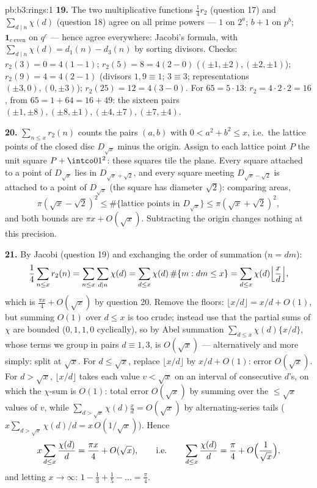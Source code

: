 \begin{solution}{pb:b3:rings:1}
\textbf{19.} The two multiplicative functions
$\frac14r_2$ (question 17) and $\sum_{d\mid n}\chi(d)$
(question 18) agree on all prime powers --- $1$ on $2^a$;
$b + 1$ on $p^b$; $\mathbf 1_{c\ \mathrm{even}}$ on $q^c$ ---
hence agree everywhere: Jacobi's formula, with $\sum_{d\mid
n}\chi(d) = d_1(n) - d_3(n)$ by sorting divisors. Checks:
$r_2(3) = 0 = 4(1 - 1)$; $r_2(5) = 8 = 4(2 - 0)$
($(\pm1,\pm2), (\pm2,\pm1)$); $r_2(9) = 4 = 4(2 - 1)$
(divisors $1, 9 \equiv 1$; $3 \equiv 3$; representations
$(\pm3, 0), (0, \pm3)$); $r_2(25) = 12 = 4(3 - 0)$. For $65 =
5\cdot13$: $r_2 = 4\cdot2\cdot2 = 16$, from $65 = 1 + 64 = 16
+ 49$: the sixteen pairs $(\pm1, \pm8), (\pm8, \pm1), (\pm4,
\pm7), (\pm7, \pm4)$.

\textbf{20.} $\sum_{n \leq x}r_2(n)$ counts the pairs $(a, b)$
with $0 < a^2 + b^2 \leq x$, i.e.\ the lattice points of the
closed disc $D_{\sqrt x}$ minus the origin. Assign to each
lattice point $P$ the unit square $P + \intco01^2$: these
squares tile the plane. Every square attached to a point of
$D_{\sqrt x}$ lies in $D_{\sqrt x + \sqrt2}$, and every square
meeting $D_{\sqrt x - \sqrt 2}$ is attached to a point of
$D_{\sqrt x}$ (the square has diameter $\sqrt 2$): comparing
areas,
\[
\pi(\sqrt x - \sqrt2)^2 \leq \#\{\text{lattice points in }
D_{\sqrt x}\} \leq \pi(\sqrt x + \sqrt 2)^2,
\]
and both bounds are $\pi x + O(\sqrt x)$. Subtracting the
origin changes nothing at this precision.

\textbf{21.} By Jacobi (question 19) and exchanging the order
of summation ($n = dm$):
\[
\frac14\sum_{n\leq x}r_2(n) = \sum_{n \leq x}\sum_{d \mid
n}\chi(d) = \sum_{d \leq x}\chi(d)\,\#\{m : dm \leq x\}
= \sum_{d\leq x}\chi(d)\Bigl\lfloor\frac xd\Bigr\rfloor,
\]
which is $\frac{\pi x}4 + O(\sqrt x)$ by question 20. Remove
the floors: $\lfloor x/d\rfloor = x/d + O(1)$, but summing
$O(1)$ over $d \leq x$ is too crude; instead use that the
partial sums of $\chi$ are bounded ($0, 1, 1, 0$ cyclically),
so by Abel summation $\sum_{d\leq x}\chi(d)\{x/d\}$, whose
terms we group in pairs $d \equiv 1, 3$, is $O(\sqrt x)$ ---
alternatively and more simply: split at $\sqrt x$. For $d \leq
\sqrt x$, replace $\lfloor x/d\rfloor$ by $x/d + O(1)$: error
$O(\sqrt x)$. For $d > \sqrt x$, $\lfloor x/d\rfloor$ takes
each value $v < \sqrt x$ on an interval of consecutive $d$'s,
on which the $\chi$-sum is $O(1)$: total error $O(\sqrt x)$ by
summing over the $\leq \sqrt x$ values of $v$, while
$\sum_{d > \sqrt x}\chi(d)\frac xd = O(\sqrt x)$ by
alternating-series tails ($x\sum_{d>\sqrt x}\chi(d)/d =
x\,O(1/\sqrt x)$). Hence
\[
x\sum_{d \leq x}\frac{\chi(d)}d = \frac{\pi x}4 + O(\sqrt x),
\qquad\text{i.e.}\qquad
\sum_{d\leq x}\frac{\chi(d)}d = \frac\pi4 +
O\Bigl(\frac1{\sqrt x}\Bigr),
\]
and letting $x \to \infty$: $1 - \frac13 + \frac15 - \dots =
\frac\pi4$.


\end{solution}
